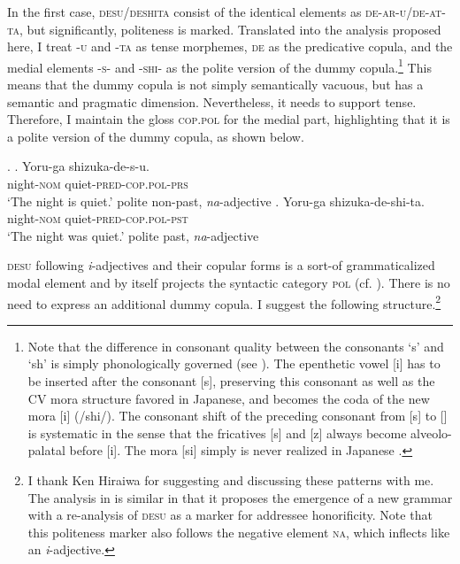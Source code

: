 In the first case, \textsc{desu/deshita} consist of the identical elements as \textsc{de-ar-u/de-at-ta}, but significantly, politeness is marked. Translated into the analysis proposed here, I treat -\textsc{u} and -\textsc{ta} as tense morphemes, \textsc{de} as the predicative copula, and the medial elements -\textsc{s}- and -\textsc{shi}- as the polite version of the dummy copula.\footnote{Note that the difference in consonant quality between the consonants `s' and `sh' is simply phonologically governed (see \citealt{ito:2015:word}). The epenthetic vowel [i] has to be inserted after the consonant [s], preserving this consonant as well as the CV mora structure favored in Japanese, and becomes the coda of the new mora [\textctc i] (/shi/). The consonant shift of the preceding consonant from [s] to [\textctc] is systematic in the sense that the fricatives [s] and [z] always become alveolo-palatal before [i]. The mora [si] simply is never realized in Japanese \citep{lewin:1989:sprache, vance:2008:sounds}.} This means that the dummy copula is not simply semantically vacuous, but has a semantic and pragmatic dimension. Nevertheless, it needs to support tense. Therefore, I maintain the gloss \textsc{cop.pol} for the medial part, highlighting that it is a polite version of the dummy copula, as shown below.

\ex. \ag. Yoru-ga shizuka-de-s-u.\\
night-\textsc{nom} quiet-\textsc{pred-cop.pol-prs}\\
`The night is quiet.' \null \hfill polite non-past, \textit{na}-adjective
\bg. Yoru-ga shizuka-de-shi-ta.\\
night-\textsc{nom} quiet-\textsc{pred-cop.pol-pst}\\
`The night was quiet.' \null \hfill polite past, \textit{na}-adjective

\largerpage
\textsc{desu} following \textit{i}-adjectives and their copular forms is a sort-of grammaticalized modal element and by itself projects the syntactic category \textsc{pol} (cf. \citealt[10–11]{yamada:2023:looking}). There is no need to express an additional dummy copula. I suggest the following structure.\footnote{I thank Ken Hiraiwa for suggesting and discussing these patterns with me. The analysis in \citet{yamada:2023:looking} is similar in that it proposes the emergence of a new grammar with a re-analysis of \textsc{desu} as a marker for addressee honorificity. Note that this politeness marker also follows the negative element \textsc{na}, which inflects like an \textit{i}-adjective.}

